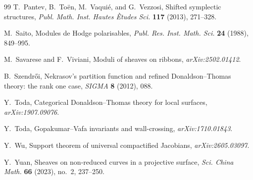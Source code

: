 \documentclass[11pt,reqno]{amsart}
\theoremstyle{definition}
\begin{document}
\begin{thebibliography}{99}
T.~Pantev, B.~To\"en, M.~Vaqui\'e, and G.~Vezzosi,
Shifted symplectic structures,
\emph{Publ. Math. Inst. Hautes \`Etudes Sci.} \textbf{117} (2013),
271--328.

M.~Saito,
Modules de Hodge polarisables,
\emph{Publ. Res. Inst. Math. Sci.} \textbf{24} (1988), 849--995.

M.~Savarese and F.~Viviani,
Moduli of sheaves on ribbons,
\emph{arXiv:2502.01412}.

B.~Szendr\H{o}i,
Nekrasov's partition function and refined Donaldson--Thomas theory:
the rank one case,
\emph{SIGMA} \textbf{8} (2012), 088.

Y.~Toda,
Categorical Donaldson--Thomas theory for local surfaces,
\emph{arXiv:1907.09076}.

Y.~Toda,
Gopakumar--Vafa invariants and wall-crossing,
\emph{arXiv:1710.01843}.

Y.~Wu,
Support theorem of universal compactified Jacobians,
\emph{arXiv:2605.03097}.

Y.~Yuan,
Sheaves on non-reduced curves in a projective surface,
\emph{Sci. China Math.} \textbf{66} (2023), no.~2, 237--250.

\end{thebibliography}
\end{document}
